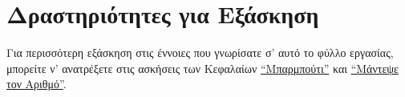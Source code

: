 \documentclass[a4paper,11pt,oneside]{book}
\begin{document}
\marginnote[14pt]{\icondiscuss}
\dottedline

\dottedline


\section{Δραστηριότητες για Εξάσκηση}

%
Για περισσότερη εξάσκηση στις έννοιες που γνωρίσατε σ' αυτό το φύλλο εργασίας, μπορείτε ν' ανατρέξετε στις ασκήσεις των %
Κεφαλαίων \href{http://pythonies.mysch.gr/chapters/craps.pdf}{``Μπαρμπούτι''} και \href{http://pythonies.mysch.gr/chapters/guess.pdf}{``Μάντεψε τον Αριθμό''}.
\end{document}
